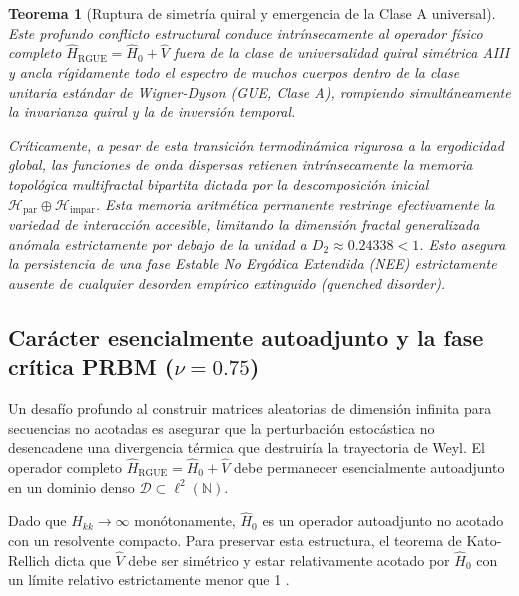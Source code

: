 \documentclass[aps,prl,preprint,superscriptaddress,floatfix]{revtex4-2}
\newtheorem{theorem}{Teorema}[section]
\newcommand{\N}{\mathbb{N}}
\newcommand{\Hilb}{\mathcal{H}}
\begin{document}
\begin{theorem}[Ruptura de simetría quiral y emergencia de la Clase A universal]
Este profundo conflicto estructural conduce intrínsecamente al operador físico completo $\hat{H}_{\text{RGUE}} = \hat{H}_0 + \hat{V}$ fuera de la clase de universalidad quiral simétrica AIII y ancla rígidamente todo el espectro de muchos cuerpos dentro de la clase unitaria estándar de Wigner-Dyson (GUE, Clase A), rompiendo simultáneamente la invarianza quiral y la de inversión temporal.

Críticamente, a pesar de esta transición termodinámica rigurosa a la ergodicidad global, las funciones de onda dispersas retienen intrínsecamente la memoria topológica multifractal bipartita dictada por la descomposición inicial $\Hilb_{\text{par}} \oplus \Hilb_{\text{impar}}$. Esta memoria aritmética permanente restringe efectivamente la variedad de interacción accesible, limitando la dimensión fractal generalizada anómala estrictamente por debajo de la unidad a $D_2 \approx 0.24338 < 1$. Esto asegura la persistencia de una fase Estable No Ergódica Extendida (NEE) estrictamente ausente de cualquier desorden empírico extinguido (\textit{quenched disorder}).
\end{theorem}

\subsection{Carácter esencialmente autoadjunto y la fase crítica PRBM (\texorpdfstring{$\nu = 0.75$}{nu = 0.75})}

Un desafío profundo al construir matrices aleatorias de dimensión infinita para secuencias no acotadas es asegurar que la perturbación estocástica no desencadene una divergencia térmica que destruiría la trayectoria de Weyl. El operador completo $\hat{H}_{\text{RGUE}} = \hat{H}_0 + \hat{V}$ debe permanecer esencialmente autoadjunto en un dominio denso $\mathcal{D} \subset \ell^2(\N)$.

Dado que $H_{kk} \to \infty$ monótonamente, $\hat{H}_0$ es un operador autoadjunto no acotado con un resolvente compacto. Para preservar esta estructura, el teorema de Kato-Rellich dicta que $\hat{V}$ debe ser simétrico y estar relativamente acotado por $\hat{H}_0$ con un límite relativo estrictamente menor que 1 \cite{ReedSimon1975}. 
\end{document}
